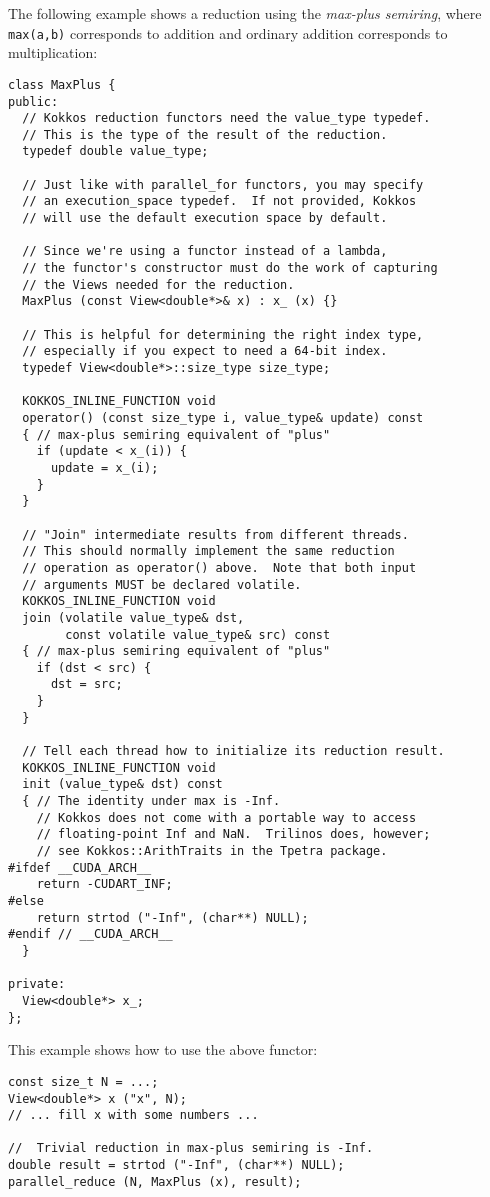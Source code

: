 The following example shows a reduction using the \emph{max-plus semiring},
where \lstinline!max(a,b)! corresponds to addition and ordinary addition corresponds to multiplication:
\begin{lstlisting}
class MaxPlus {
public:
  // Kokkos reduction functors need the value_type typedef.
  // This is the type of the result of the reduction.
  typedef double value_type;

  // Just like with parallel_for functors, you may specify 
  // an execution_space typedef.  If not provided, Kokkos
  // will use the default execution space by default.

  // Since we're using a functor instead of a lambda,
  // the functor's constructor must do the work of capturing
  // the Views needed for the reduction.
  MaxPlus (const View<double*>& x) : x_ (x) {}

  // This is helpful for determining the right index type,
  // especially if you expect to need a 64-bit index.
  typedef View<double*>::size_type size_type;

  KOKKOS_INLINE_FUNCTION void
  operator() (const size_type i, value_type& update) const
  { // max-plus semiring equivalent of "plus"
    if (update < x_(i)) {
      update = x_(i);
    }
  }

  // "Join" intermediate results from different threads.
  // This should normally implement the same reduction 
  // operation as operator() above.  Note that both input
  // arguments MUST be declared volatile.
  KOKKOS_INLINE_FUNCTION void
  join (volatile value_type& dst,
        const volatile value_type& src) const
  { // max-plus semiring equivalent of "plus"
    if (dst < src) {
      dst = src;
    }
  }

  // Tell each thread how to initialize its reduction result.
  KOKKOS_INLINE_FUNCTION void
  init (value_type& dst) const
  { // The identity under max is -Inf.
    // Kokkos does not come with a portable way to access 
    // floating-point Inf and NaN.  Trilinos does, however; 
    // see Kokkos::ArithTraits in the Tpetra package.
#ifdef __CUDA_ARCH__
    return -CUDART_INF;
#else
    return strtod ("-Inf", (char**) NULL);
#endif // __CUDA_ARCH__
  }

private:
  View<double*> x_;
};
\end{lstlisting}

This example shows how to use the above functor:
\begin{lstlisting}
const size_t N = ...;
View<double*> x ("x", N);
// ... fill x with some numbers ... 

//  Trivial reduction in max-plus semiring is -Inf.
double result = strtod ("-Inf", (char**) NULL);
parallel_reduce (N, MaxPlus (x), result);
\end{lstlisting}

